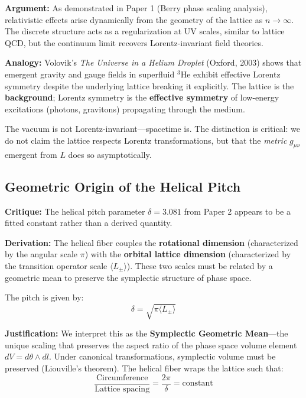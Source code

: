 \documentclass[aps,prd,twocolumn,superscriptaddress,groupedaddress,showpacs]{revtex4-2}
\begin{document}
\textbf{Argument:} As demonstrated in Paper 1 (Berry phase scaling analysis), relativistic effects arise dynamically from the geometry of the lattice as $n \to \infty$. The discrete structure acts as a regularization at UV scales, similar to lattice QCD, but the continuum limit recovers Lorentz-invariant field theories.

\textbf{Analogy:} Volovik's \emph{The Universe in a Helium Droplet} (Oxford, 2003) shows that emergent gravity and gauge fields in superfluid $^3$He exhibit effective Lorentz symmetry despite the underlying lattice breaking it explicitly. The lattice is the \textbf{background}; Lorentz symmetry is the \textbf{effective symmetry} of low-energy excitations (photons, gravitons) propagating through the medium.

The vacuum is not Lorentz-invariant---spacetime is. The distinction is critical: we do not claim the lattice respects Lorentz transformations, but that the \emph{metric} $g_{\mu\nu}$ emergent from $L$ does so asymptotically.

\subsection{Geometric Origin of the Helical Pitch}
\label{sec:consistency_helical}

\textbf{Critique:} The helical pitch parameter $\delta = 3.081$ from Paper 2 appears to be a fitted constant rather than a derived quantity.

\textbf{Derivation:} The helical fiber couples the \textbf{rotational dimension} (characterized by the angular scale $\pi$) with the \textbf{orbital lattice dimension} (characterized by the transition operator scale $\langle L_\pm \rangle$). These two scales must be related by a geometric mean to preserve the symplectic structure of phase space.

The pitch is given by:
\begin{equation}
\delta = \sqrt{\pi \langle L_\pm \rangle}
\end{equation}

\textbf{Justification:} We interpret this as the \textbf{Symplectic Geometric Mean}---the unique scaling that preserves the aspect ratio of the phase space volume element $dV = d\theta \wedge dl$. Under canonical transformations, symplectic volume must be preserved (Liouville's theorem). The helical fiber wraps the lattice such that:
\begin{equation}
\frac{\text{Circumference}}{\text{Lattice spacing}} = \frac{2\pi}{\delta} = \text{constant}
\end{equation}
\end{document}
